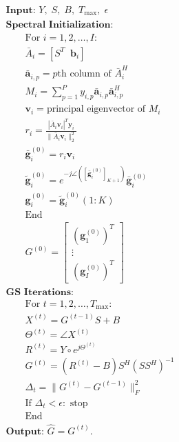 \documentclass[12pt,a4paper]{article}
\begin{document}
\begin{equation}
\boxed{
\begin{array}{l}
\textbf{Input: }
Y,\;S,\;B,\;T_{\max},\;\epsilon
\\[2mm]
\textbf{Spectral Initialization:}
\\
\qquad
\text{For }i=1,2,\ldots,I:
\\
\qquad
\bar A_i=[S^T\;\;\mathbf b_i]
\\
\qquad
\bar{\mathbf a}_{i,p}
=
\text{$p$th column of }\bar A_i^H
\\
\qquad
M_i
=
\displaystyle\sum_{p=1}^{P}
y_{i,p}
\bar{\mathbf a}_{i,p}
\bar{\mathbf a}_{i,p}^{H}
\\
\qquad
\mathbf v_i
=
\text{principal eigenvector of }M_i
\\
\qquad
r_i
=
\displaystyle
\frac{
|\bar A_i\mathbf v_i|^T\mathbf y_i
}{
\|\bar A_i\mathbf v_i\|_2^2
}
\\
\qquad
\bar{\mathbf g}_i^{(0)}
=
r_i\mathbf v_i
\\
\qquad
\widetilde{\mathbf g}_i^{(0)}
=
e^{-j\angle([\bar{\mathbf g}_i^{(0)}]_{K+1})}
\bar{\mathbf g}_i^{(0)}
\\
\qquad
\mathbf g_i^{(0)}
=
\widetilde{\mathbf g}_i^{(0)}(1:K)
\\
\qquad
\text{End}
\\[2mm]
\qquad
G^{(0)}
=
\begin{bmatrix}
(\mathbf g_1^{(0)})^T\\
\vdots\\
(\mathbf g_I^{(0)})^T
\end{bmatrix}
\\[3mm]
\textbf{GS Iterations:}
\\
\qquad
\text{For }t=1,2,\ldots,T_{\max}:
\\
\qquad
X^{(t)}
=
G^{(t-1)}S+B
\\
\qquad
\Theta^{(t)}
=
\angle X^{(t)}
\\
\qquad
R^{(t)}
=
Y\circ e^{j\Theta^{(t)}}
\\
\qquad
G^{(t)}
=
(R^{(t)}-B)
S^H
(SS^H)^{-1}
\\
\qquad
\Delta_t
=
\|G^{(t)}-G^{(t-1)}\|_F^2
\\
\qquad
\text{If }\Delta_t<\epsilon:
\text{ stop}
\\
\qquad
\text{End}
\\[2mm]
\textbf{Output: }
\boxed{\widehat G=G^{(t)}}.
\end{array}
}
\tag{369}
\end{equation}

\end{document}
